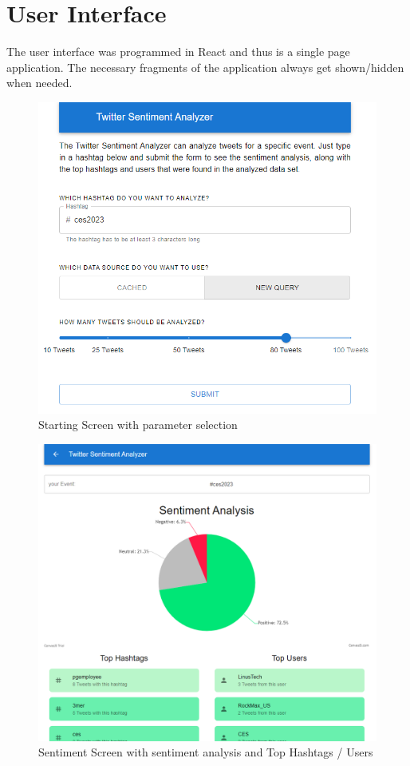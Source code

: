 \documentclass[a4paper,oneside,11pt]{scrreprt}
\begin{document}
\chapter{User Interface}
The user interface was programmed in React and thus is a single page application. The necessary fragments of the application always get shown/hidden when needed.

\begin{figure}[H]
    \centering
    \caption{Starting Screen with parameter selection}
    \includegraphics[width=\textwidth]{media/3_StartScreen.png}
\end{figure}

\begin{figure}[H]
    \centering
    \caption{Sentiment Screen with sentiment analysis and Top Hashtags / Users}
    \includegraphics[width=\textwidth]{media/3_SentimentScreen.png}
\end{figure}
\end{document}
